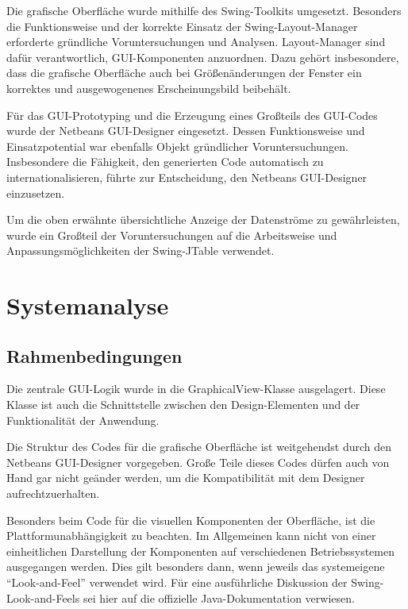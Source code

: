        Die grafische Oberfläche wurde mithilfe des Swing-Toolkits umgesetzt.
        Besonders die Funktionsweise und der korrekte Einsatz der
        Swing-Layout-Manager erforderte gründliche Voruntersuchungen und
        Analysen. Layout-Manager sind dafür verantwortlich, GUI-Komponenten
        anzuordnen. Dazu gehört insbesondere, dass die grafische Oberfläche auch
        bei Größenänderungen der Fenster ein korrektes und ausgewogenenes
        Erscheinungsbild beibehält.
        
        Für das GUI-Prototyping und die Erzeugung eines Großteils des GUI-Codes
        wurde der Netbeans GUI-Designer eingesetzt. Dessen Funktionsweise und
        Einsatzpotential war ebenfalls Objekt gründlicher Voruntersuchungen.
        Insbesondere die Fähigkeit, den generierten Code automatisch zu
        internationalisieren, führte zur Entscheidung, den Netbeans GUI-Designer
        einzusetzen.
        
        Um die oben erwähnte übersichtliche Anzeige der Datenströme zu
        gewährleisten, wurde ein Großteil der Voruntersuchungen auf die
        Arbeitsweise und Anpassungsmöglichkeiten der Swing-JTable verwendet.
     
    \section{Systemanalyse}
    
        \subsection{Rahmenbedingungen}
        
            Die zentrale GUI-Logik wurde in die GraphicalView-Klasse
            ausgelagert. Diese Klasse ist auch die Schnittstelle zwischen den
            Design-Elementen und der Funktionalität der Anwendung.
            
            Die Struktur des Codes für die grafische Oberfläche ist weitgehendst
            durch den Netbeans GUI-Designer vorgegeben. Große Teile dieses Codes
            dürfen auch von Hand gar nicht geänder werden, um die Kompatibilität
            mit dem Designer aufrechtzuerhalten.
            
            Besonders beim Code für die visuellen Komponenten der Oberfläche,
            ist die Plattformunabhängigkeit zu beachten. Im Allgemeinen kann
            nicht von einer einheitlichen Darstellung der Komponenten auf
            verschiedenen Betriebssystemen ausgegangen werden. Dies gilt
            besonders dann, wenn jeweils das systemeigene ``Look-and-Feel''
            verwendet wird. Für eine ausführliche Diskussion der
            Swing-Look-and-Feels sei hier auf die offizielle Java-Dokumentation
            verwiesen.
        
